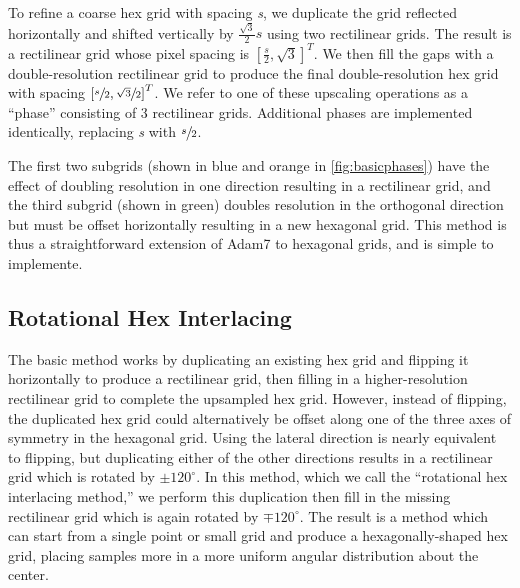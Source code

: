 \documentclass[aip, amsmath, amssymb, nobibnotes, nofootinbib, citeautoscript, reprint, superscriptaddress]{revtex4-2}
\begin{document}
    To refine a coarse hex grid with spacing \textit{s}, we duplicate the grid reflected horizontally and shifted vertically by $\frac{\sqrt{3}}{2}s$ using two rectilinear grids.
    The result is a rectilinear grid whose pixel spacing is $\left[\frac{s}{2}, \sqrt{3}\right]^T$.
    We then fill the gaps with a double-resolution rectilinear grid to produce the final double-resolution hex grid with spacing $\left[\sfrac{s}{2}, \sfrac{\sqrt{3}}{2}\right]^T$.
    We refer to one of these upscaling operations as a ``phase'' consisting of 3 rectilinear grids.
    Additional phases are implemented identically, replacing \textit{s} with $\sfrac{s}{2}$.



    The first two subgrids (shown in blue and orange in \autoref{fig:basicphases}) have the effect of doubling resolution in one direction
    resulting in a rectilinear grid, and the third subgrid (shown in green) doubles resolution in the orthogonal direction but must be
    offset horizontally resulting in a new hexagonal grid.
    This method is thus a straightforward extension of Adam7 to hexagonal grids, and
    is simple to implemente.


    \subsection{\label{ssec:triple-grid-interlacing}Rotational Hex Interlacing}

    The basic method works by duplicating an existing hex grid and flipping it horizontally to produce a rectilinear grid, then filling in a higher-resolution rectilinear grid to complete the upsampled hex grid.
    However, instead of flipping, the duplicated hex grid could alternatively be offset along one of the three axes of symmetry in the hexagonal grid.
    Using the lateral direction is nearly equivalent to flipping, but duplicating either of the other directions results in a rectilinear grid which is rotated by $\pm 120^{\circ}$.
    In this method, which we call the ``rotational hex interlacing method,'' we perform this duplication then fill in the missing rectilinear grid which is again rotated by $\mp 120^{\circ}$.
    The result is a method which can start from a single point or small grid and produce a hexagonally-shaped hex grid, placing samples more in a more uniform angular distribution about the center.
\end{document}
